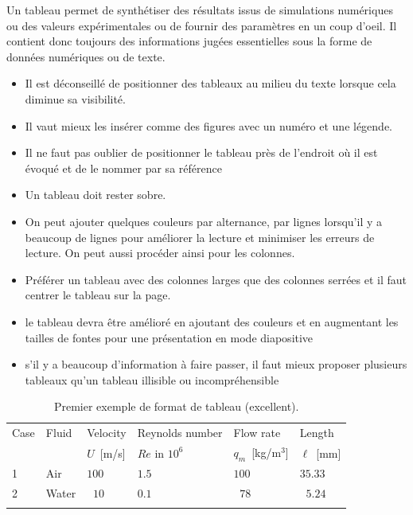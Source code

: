 




Un  tableau permet de synthétiser des résultats issus de simulations numériques ou des valeurs expérimentales 
ou de fournir des paramètres en un coup d'oeil. 
Il contient donc toujours des informations jugées  essentielles sous la forme de données numériques ou de texte.

\begin{itemize}
\item Il est déconseillé de positionner des tableaux au milieu du texte lorsque cela diminue sa visibilité.
\item Il vaut mieux les insérer comme des figures avec un numéro et une légende.
\item Il ne faut pas oublier de positionner le tableau près de l'endroit où il est évoqué et de le nommer par sa référence
\item Un tableau doit rester sobre.  
 \item On peut ajouter quelques couleurs par alternance, par lignes lorsqu'il y a beaucoup de lignes pour améliorer la lecture
 et minimiser les erreurs de lecture. On peut aussi procéder ainsi pour les colonnes.
\item Préférer un tableau avec des colonnes larges que des colonnes serrées et il faut  centrer le tableau sur la page.
\item le tableau devra être amélioré en ajoutant des couleurs et en augmentant les tailles de fontes 
pour une présentation en mode diapositive
\item s'il y a beaucoup d'information à faire passer, il faut mieux proposer plusieurs tableaux qu'un tableau illisible ou incompréhensible
\end{itemize}




\begin{table}[htb]


\small
\centering
\begin{tabular}{p{1.5cm}p{2.5cm}p{2.5cm}p{3.5cm}p{3cm}p{2cm} }
\Xhline{2pt}
Case    &      Fluid    & Velocity     & Reynolds number   &  Flow rate     & Length \\ 
        &               & $U$~[m/s]    & $Re$ in $10^6$  &  $q_m$~[kg/m$^3$] &  $\ell$~[mm] \\ \Xhline{1pt}
1       & Air           & $100$        &   $1.5$         &  $100$            &  $35.33$     \\
2       & Water         &  $\;\;10$        &   $0.1$         &  $\;\;78$             &  $\;\;5.24$  \\
\Xhline{2pt}
\end{tabular}
\caption{Premier exemple  de format de tableau (excellent).}           
\label{tab:exemple1}   
\normalsize
{}
\end{table}


